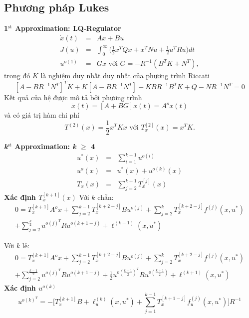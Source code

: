 \documentclass[11pt]{beamer}
\begin{document}
\subsection{Phương pháp Lukes}

\begin{frame}
	\textbf{1$^\text{st}$ Approximation: LQ-Regulator} \begin{eqnarray}
	\dot{x}(t) &=& Ax + Bu \nonumber \\
	J(u) &=& \int_{0}^{\infty}\bigg(\frac{1}{2}x^TQx + x^TNu + \frac{1}{2}u^TRu\bigg)dt \nonumber \\ u^{o(1)} &=& Gx \text{ với } G = -R^{-1}(B^TK + N^T), \nonumber
	\end{eqnarray} trong đó $K$ là nghiệm duy nhất duy nhất của phương trình Riccati $$[A-BR^{-1}N^T]^TK + K[A-BR^{-1}N^T] - KBR^{-1}B^TK + Q - NR^{-1}N^T = 0$$ Kết quả của hệ được mô tả bởi phương trình $$\dot{x}(t) = [A + BG]x(t) = A^ox(t)$$ và có giá trị hàm chi phí $$T^{(2)}(x) = \frac{1}{2}x^TKx \text{ với } T_x^{[2]}(x) = x^TK.$$
\end{frame}

\begin{frame}
	\textbf{\textit{k}$^\text{st}$ Approximation: \textit{k} $\geq$ 4}
	\begin{eqnarray}
	u^*(x) &=& \sum_{i=1}^{k-1}u^{o(i)} \nonumber\\ u^{o}(x) &=& u^*(x) + u^{o(k)}(x) \nonumber\\ T_x(x) &=& \sum_{j=2}^{k+1}T_x^{[j]}(x) \nonumber
	\end{eqnarray}
\textbf{Xác định $T_x^{[k+1]}(x)$} \qquad Với $k$ chẵn:
		\begin{equation}
		\begin{split}
		0 = T_x^{[k+1]}A^ox + \sum_{j=2}^{k-1}T_x^{[k+2-j]}Bu^{o(j)} + \sum_{j=2}^{k}T_x^{[k+2-j]}f^{(j)}(x, u^*) \\+ \sum_{j=2}^{\frac{k}{2}}u^{o(j)^T}Ru^{o(k+1-j)} + \ell^{(k+1)}(x, u^*)
		\end{split} 
		\end{equation}
\end{frame}

\begin{frame}
	Với $k$ lẻ:
	\begin{equation}
	\begin{split}
	0 = T_x^{[k+1]}A^ox + \sum_{j=2}^{k-1}T_x^{[k+2-j]}Bu^{o(j)} + \sum_{j=2}^{k}T_x^{[k+2-j]}f^{(j)}(x, u^*) \\ + \sum_{j=2}^{\frac{k-1}{2}}u^{o(j)^T}Ru^{o(k+1-j)} + \frac{1}{2}
	u^{o(\frac{k+1}{2})^T}Ru^{o(\frac{k+1}{2})} + \ell^{(k+1)}(x, u^*) 		
	\end{split}
	\end{equation}
	\textbf{Xác định $u^{o(k)}$} 
	\begin{equation}
		u^{o(k)^T} = - \Big[T_x^{[k+1]}B + \ell_u^{(k)}(x, u^*) + \sum_{j=1}^{k-1}T_x^{[k+1-j]}f_u^{(j)}(x, u^*)\Big]R^{-1}
	\end{equation}
\end{frame}
\end{document}
